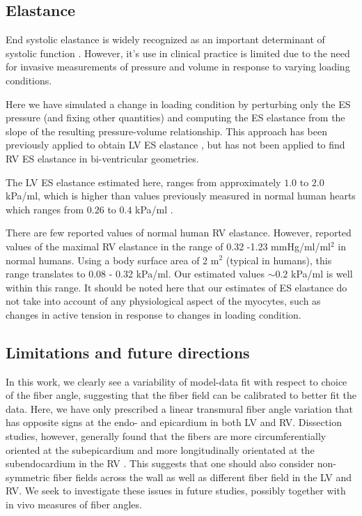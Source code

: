 

\subsection{Elastance}
End systolic elastance is widely recognized as an important determinant of
systolic function \citep{sagawa1977end}. However, it's use in clinical
practice is limited due to the need for invasive measurements of pressure
and volume in response to varying loading conditions.

Here we have simulated a change in loading condition by perturbing
only the ES pressure (and fixing other quantities) and computing the ES
elastance from the slope of the resulting pressure-volume
relationship. This approach has been previously applied to obtain LV
ES elastance \citep{finsberg2017estimating}, but has not been applied
to find RV ES elastance in bi-ventricular geometries. 

The LV ES elastance estimated here, ranges from
approximately $1.0$ to $2.0$ kPa/ml, which is higher than values previously measured
in normal human hearts which ranges from $0.26$ to $0.4$ kPa/ml \citep{chen1998coupled}.

There are few reported values of normal human RV elastance.
However, \citep{brown1988human} reported values of the maximal RV
elastance in the range of 0.32 -1.23 mmHg/ml/ml$^2$ in normal
humans. Using a body surface area of 2 m$^2$ (typical in humans), this
range translates to 0.08 - 0.32  kPa/ml. Our estimated values $\sim
0.2$ kPa/ml  is well within this range. It should be noted here that
our estimates of ES elastance do not take into account of any
physiological aspect of the myocytes, such as changes in active
tension in response to changes in loading condition. 

\subsection{Limitations and future directions}

In this work, we clearly see a variability of model-data fit with
respect to choice of the fiber angle,
suggesting that the fiber field can be calibrated to better fit the
data. Here, we have only prescribed a linear transmural fiber angle
variation that has opposite signs at the endo- and epicardium in both
LV and RV. Dissection studies, however, generally found that the
fibers are more circumferentially oriented at the subepicardium and
more longitudinally orientated at the subendocardium in the RV
\citep{ho2006anatomy}. This suggests that one should also consider
non-symmetric fiber fields across the wall as well as different fiber
field in the LV and RV. We seek to investigate these issues in future
studies, possibly together with in vivo measures of fiber angles. 

